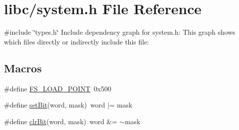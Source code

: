 \hypertarget{a00128}{}\section{libc/system.h File Reference}
\label{a00128}
{\ttfamily \#include \char`\"{}types.\+h\char`\"{}}\newline
Include dependency graph for system.\+h\+:
This graph shows which files directly or indirectly include this file\+:
\subsection*{Macros}
\begin{DoxyCompactItemize}
\item 
\#define \hyperlink{a00128_ade5f4f9306a7cacc0cb2a518bd97e237_ade5f4f9306a7cacc0cb2a518bd97e237}{F\+S\+\_\+\+L\+O\+A\+D\+\_\+\+P\+O\+I\+NT}~0x500
\item 
\#define \hyperlink{a00128_a3c47e49052cc52d10755358512c10135_a3c47e49052cc52d10755358512c10135}{set\+Bit}(word,  mask)~word $\vert$= mask
\item 
\#define \hyperlink{a00128_ab6ca194e33920928b4bdeff67bf0edec_ab6ca194e33920928b4bdeff67bf0edec}{clr\+Bit}(word,  mask)~word \&= $\sim$mask
\end{DoxyCompactItemize}
